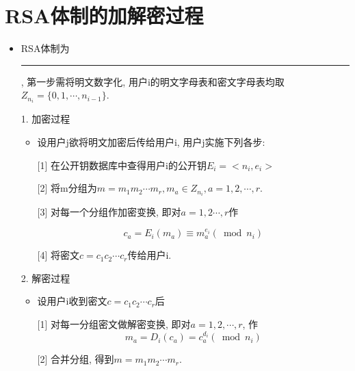 \documentclass[UTF8]{ctexart}
\newcommand\hl{\bgroup\markoverwith
  {\textcolor{yellow}{\rule[-.5ex]{2pt}{2.5ex}}}\ULon}
\begin{document}
    \section{RSA体制的加解密过程}
    \begin{itemize}
        \renewcommand{\labelitemi}{\scriptsize$\blacksquare$}
        \item RSA体制为\hl{分组密码体制}, 第一步需将明文数字化, 用户i的明文字母表和密文字母表均取$Z_{n_i}=\{0,1,\cdots,n_{i-1}\}$.

        1. 加密过程
        \begin{itemize}
            \item 设用户j欲将明文加密后传给用户i, 用户j实施下列各步:

            [1] 在公开钥数据库中查得用户i的公开钥$E_i=<n_i, e_i>$

            [2] 将m分组为$m=m_1m_2\cdots m_r, m_a\in Z_{n_i}, a=1,2,\cdots,r$.

            [3] 对每一个分组作加密变换, 即对$a=1,2\cdots,r$作

            $$
            c_a=E_i(m_a)\equiv m_a^{e_i}(\bmod n_i)
            $$

            [4] 将密文$c=c_1c_2\cdots c_r$传给用户i.
        \end{itemize}

        2. 解密过程
        \begin{itemize}
            \item 设用户i收到密文$c=c_1c_2\cdots c_r$后

            [1] 对每一分组密文做解密变换, 即对$a=1,2,\cdots,r$, 作
            $$m_a=D_i(c_a)=c_a^{d_i}(\bmod n_i)$$

            [2] 合并分组, 得到$m=m_1m_2\cdots m_r$.
        \end{itemize}
    \end{itemize}
\end{document}
